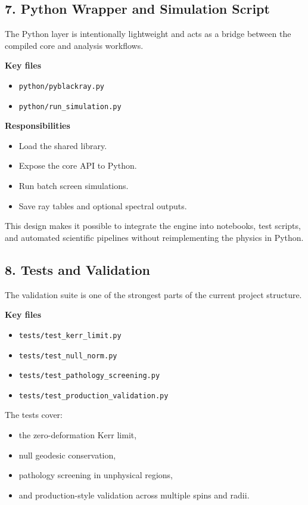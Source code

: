 \documentclass[11pt]{article}
\begin{document}
\subsection{7. Python Wrapper and Simulation Script}

The Python layer is intentionally lightweight and acts as a bridge between the compiled core and analysis workflows.

\textbf{Key files}

\begin{itemize}[leftmargin=1.5em]
    \item \texttt{python/pyblackray.py}
    \item \texttt{python/run_simulation.py}
\end{itemize}

\textbf{Responsibilities}

\begin{itemize}[leftmargin=1.5em]
    \item Load the shared library.
    \item Expose the core API to Python.
    \item Run batch screen simulations.
    \item Save ray tables and optional spectral outputs.
\end{itemize}

This design makes it possible to integrate the engine into notebooks, test scripts, and automated scientific pipelines without reimplementing the physics in Python.

\subsection{8. Tests and Validation}

The validation suite is one of the strongest parts of the current project structure.

\textbf{Key files}

\begin{itemize}[leftmargin=1.5em]
    \item \texttt{tests/test_kerr_limit.py}
    \item \texttt{tests/test_null_norm.py}
    \item \texttt{tests/test_pathology_screening.py}
    \item \texttt{tests/test_production_validation.py}
\end{itemize}

The tests cover:

\begin{itemize}[leftmargin=1.5em]
    \item the zero-deformation Kerr limit,
    \item null geodesic conservation,
    \item pathology screening in unphysical regions,
    \item and production-style validation across multiple spins and radii.
\end{itemize}
\end{document}
